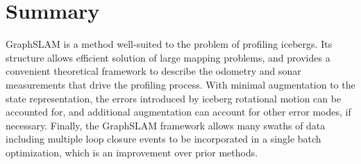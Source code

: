 \label{sec.DesignConsiderations}

\section{Summary}

GraphSLAM is a method well-suited to the problem of profiling icebergs. Its structure allows efficient solution of large mapping problems, and provides a convenient theoretical framework to describe the odometry and sonar measurements that drive the profiling process. With minimal augmentation to the state representation, the errors introduced by iceberg rotational motion can be accounted for, and additional augmentation can account for other error modes, if necessary. Finally, the GraphSLAM framework allows many swaths of data including multiple loop closure events to be incorporated in a single batch optimization, which is an improvement over prior methods.